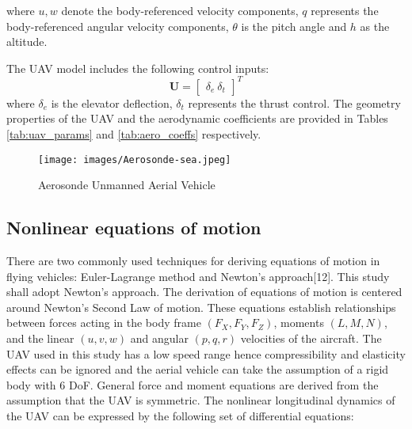 \documentclass[12pt]{article}
\begin{document}
where $u, w$ denote the body-referenced velocity components, $q$ represents the body-referenced angular velocity components, $\theta$ is the pitch angle and $h$ as the altitude.

The UAV model includes the following control inputs:
\begin{equation}
    \mathbf{U} = \begin{bmatrix} \delta_e \ \delta_t  \end{bmatrix}^T
\end{equation}
where $\delta_e$ is the elevator deflection, $\delta_t$ represents the thrust control. The geometry properties of the UAV and the aerodynamic coefficients are provided in Tables \ref{tab:uav_params} and \ref{tab:aero_coeffs} respectively.
\begin{figure}
\centering
\texttt{[image: images/Aerosonde-sea.jpeg]}
\caption{\label{fig:1}Aerosonde Unmanned Aerial Vehicle}
\end{figure}
\subsection{Nonlinear equations of motion}
There are two commonly used techniques for deriving equations of motion in flying
vehicles: Euler-Lagrange method and Newton’s approach[12]. This study shall adopt Newton's approach. The derivation of equations of motion is centered around Newton's Second Law of motion. These equations establish relationships between forces acting in the body frame $(F_X, F_Y, F_Z)$, moments $(L, M, N)$, and the linear $(u, v, w)$ and angular $(p, q, r)$ velocities of the aircraft.
The UAV used in this study has a low speed range hence compressibility and elasticity effects can be ignored and the aerial vehicle can take the assumption of a rigid body with 6 DoF.
 General force and moment equations are derived from the assumption that the UAV is symmetric. The nonlinear longitudinal dynamics of the UAV can be expressed by the following set of differential equations:

    
\end{document}
